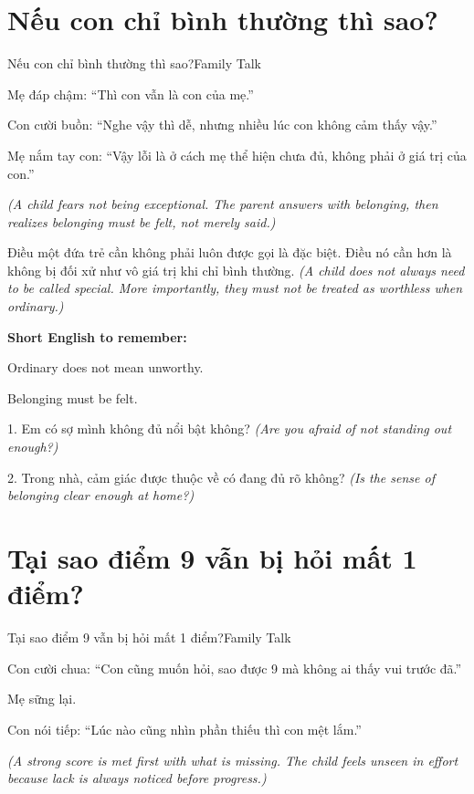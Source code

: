 \section{Nếu con chỉ bình thường thì sao?}
\begin{truyen}{Nếu con chỉ bình thường thì sao?}{Family Talk}

Mẹ đáp chậm: ``Thì con vẫn là con của mẹ.''

Con cười buồn: ``Nghe vậy thì dễ, nhưng nhiều lúc con không cảm thấy vậy.''

Mẹ nắm tay con: ``Vậy lỗi là ở cách mẹ thể hiện chưa đủ, không phải ở giá trị của con.''

\textit{(A child fears not being exceptional. The parent answers with belonging, then realizes belonging must be felt, not merely said.)}
\end{truyen}

\begin{baihoc}
Điều một đứa trẻ cần không phải luôn được gọi là đặc biệt. Điều nó cần hơn là không bị đối xử như vô giá trị khi chỉ bình thường.
\textit{(A child does not always need to be called special. More importantly, they must not be treated as worthless when ordinary.)}
\end{baihoc}

\begin{ghinhoanh}
\textbf{Short English to remember:}

Ordinary does not mean unworthy.

Belonging must be felt.
\end{ghinhoanh}

\begin{tuhocnhanh}
1. Em có sợ mình không đủ nổi bật không? \textit{(Are you afraid of not standing out enough?)}

2. Trong nhà, cảm giác được thuộc về có đang đủ rõ không? \textit{(Is the sense of belonging clear enough at home?)}
\end{tuhocnhanh}
\ngancach

\section{Tại sao điểm 9 vẫn bị hỏi mất 1 điểm?}
\begin{truyen}{Tại sao điểm 9 vẫn bị hỏi mất 1 điểm?}{Family Talk}

Con cười chua: ``Con cũng muốn hỏi, sao được 9 mà không ai thấy vui trước đã.''

Mẹ sững lại.

Con nói tiếp: ``Lúc nào cũng nhìn phần thiếu thì con mệt lắm.''

\textit{(A strong score is met first with what is missing. The child feels unseen in effort because lack is always noticed before progress.)}
\end{truyen}

